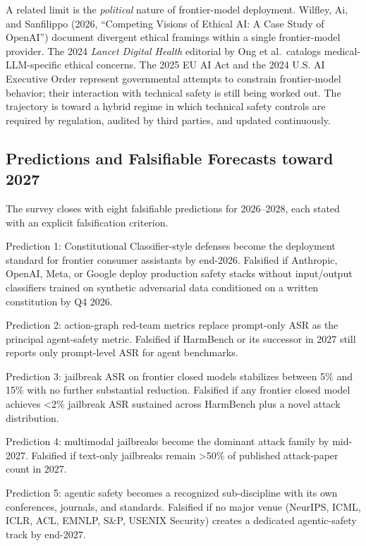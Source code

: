 \documentclass{article}
\begin{document}
A related limit is the \emph{political} nature of frontier-model deployment. Wilfley, Ai, and Sanfilippo (2026, ``Competing Visions of Ethical AI: A Case Study of OpenAI'') document divergent ethical framings within a single frontier-model provider. The 2024 \emph{Lancet Digital Health} editorial by Ong et al.~catalogs medical-LLM-specific ethical concerns. The 2025 EU AI Act and the 2024 U.S. AI Executive Order represent governmental attempts to constrain frontier-model behavior; their interaction with technical safety is still being worked out. The trajectory is toward a hybrid regime in which technical safety controls are required by regulation, audited by third parties, and updated continuously.

\subsection{Predictions and Falsifiable Forecasts toward 2027}\label{predictions-and-falsifiable-forecasts-toward-2027}

The survey closes with eight falsifiable predictions for 2026--2028, each stated with an explicit falsification criterion.

Prediction 1: Constitutional Classifier-style defenses become the deployment standard for frontier consumer assistants by end-2026. Falsified if Anthropic, OpenAI, Meta, or Google deploy production safety stacks without input/output classifiers trained on synthetic adversarial data conditioned on a written constitution by Q4 2026.

Prediction 2: action-graph red-team metrics replace prompt-only ASR as the principal agent-safety metric. Falsified if HarmBench or its successor in 2027 still reports only prompt-level ASR for agent benchmarks.

Prediction 3: jailbreak ASR on frontier closed models stabilizes between 5\% and 15\% with no further substantial reduction. Falsified if any frontier closed model achieves \textless2\% jailbreak ASR sustained across HarmBench plus a novel attack distribution.

Prediction 4: multimodal jailbreaks become the dominant attack family by mid-2027. Falsified if text-only jailbreaks remain \textgreater50\% of published attack-paper count in 2027.

Prediction 5: agentic safety becomes a recognized sub-discipline with its own conferences, journals, and standards. Falsified if no major venue (NeurIPS, ICML, ICLR, ACL, EMNLP, S\&P, USENIX Security) creates a dedicated agentic-safety track by end-2027.
\end{document}
